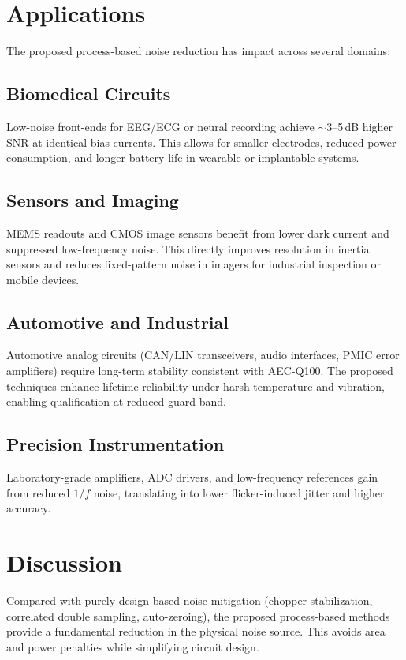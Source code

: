 \documentclass[conference]{IEEEtran}
\begin{document}
\section{Applications}
The proposed process-based noise reduction has impact across several domains:

\subsection{Biomedical Circuits}
Low-noise front-ends for EEG/ECG or neural recording achieve $\sim$3--5\,dB higher SNR at identical bias currents. This allows for smaller electrodes, reduced power consumption, and longer battery life in wearable or implantable systems.

\subsection{Sensors and Imaging}
MEMS readouts and CMOS image sensors benefit from lower dark current and suppressed low-frequency noise. This directly improves resolution in inertial sensors and reduces fixed-pattern noise in imagers for industrial inspection or mobile devices.

\subsection{Automotive and Industrial}
Automotive analog circuits (CAN/LIN transceivers, audio interfaces, PMIC error amplifiers) require long-term stability consistent with AEC-Q100. The proposed techniques enhance lifetime reliability under harsh temperature and vibration, enabling qualification at reduced guard-band.

\subsection{Precision Instrumentation}
Laboratory-grade amplifiers, ADC drivers, and low-frequency references gain from reduced $1/f$ noise, translating into lower flicker-induced jitter and higher accuracy.

\section{Discussion}
Compared with purely design-based noise mitigation (chopper stabilization, correlated double sampling, auto-zeroing), the proposed process-based methods provide a fundamental reduction in the physical noise source. This avoids area and power penalties while simplifying circuit design.
\end{document}
